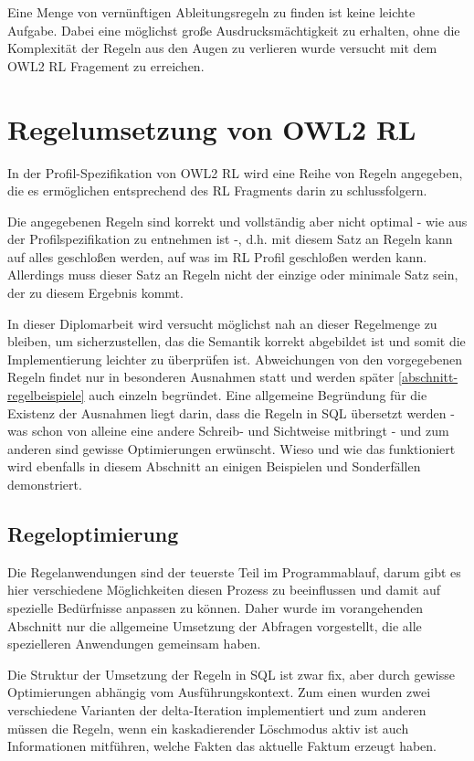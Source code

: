 Eine Menge von vernünftigen Ableitungsregeln zu finden ist keine leichte Aufgabe. Dabei eine möglichst große Ausdrucksmächtigkeit zu erhalten, ohne die Komplexität der Regeln aus den Augen zu verlieren wurde versucht mit dem OWL2 RL Fragement zu erreichen.


\section{Regelumsetzung von OWL2 RL}

In der Profil-Spezifikation von OWL2 RL \cite{OWL2Profiles} wird eine Reihe von Regeln angegeben, die es ermöglichen entsprechend des RL Fragments darin zu schlussfolgern.

Die angegebenen Regeln sind korrekt und vollständig aber nicht optimal - wie aus der Profilspezifikation zu entnehmen ist -, d.h. mit diesem Satz an Regeln kann auf alles geschloßen werden, auf was im RL Profil geschloßen werden kann. Allerdings muss dieser Satz an Regeln nicht der einzige oder minimale Satz sein, der zu diesem Ergebnis kommt.

In dieser Diplomarbeit wird versucht möglichst nah an dieser Regelmenge zu bleiben, um sicherzustellen, das die Semantik korrekt abgebildet ist und somit die Implementierung leichter zu überprüfen ist.
Abweichungen von den vorgegebenen Regeln findet nur in besonderen Ausnahmen statt und werden später \ref{abschnitt-regelbeispiele} auch einzeln begründet. Eine allgemeine Begründung für die Existenz der Ausnahmen liegt darin, dass die Regeln in SQL übersetzt werden - was schon von alleine eine andere Schreib- und Sichtweise  mitbringt - und zum anderen sind gewisse Optimierungen erwünscht.
Wieso und wie das funktioniert wird ebenfalls in diesem Abschnitt an einigen Beispielen und Sonderfällen demonstriert.






\subsection{Regeloptimierung}

Die Regelanwendungen sind der teuerste Teil im Programmablauf, darum gibt es hier verschiedene Möglichkeiten diesen Prozess zu beeinflussen und damit auf spezielle Bedürfnisse anpassen zu können. Daher wurde im vorangehenden Abschnitt nur die allgemeine Umsetzung der Abfragen vorgestellt, die alle spezielleren Anwendungen gemeinsam haben.

Die Struktur der Umsetzung der Regeln in SQL ist zwar fix, aber durch gewisse Optimierungen abhängig vom Ausführungskontext. Zum einen wurden zwei verschiedene Varianten der delta-Iteration implementiert und zum anderen müssen die Regeln, wenn ein kaskadierender Löschmodus aktiv ist auch Informationen mitführen, welche Fakten das aktuelle Faktum erzeugt haben.
